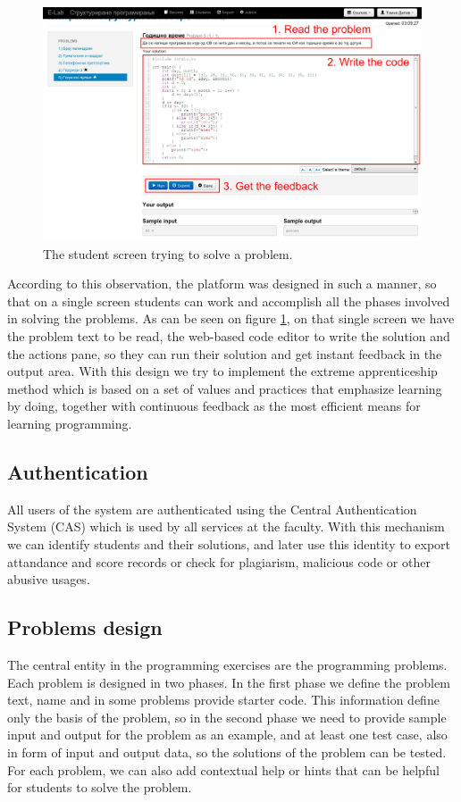 \documentclass{article}
\begin{document}
\begin{figure}
\centering
\includegraphics[width=.99\textwidth]{e-lab/user_screen}
\caption{The student screen trying to solve a problem.}
\label{fig:student_screen}
\end{figure}

According to this observation, the platform was designed in such a manner, so
that on a single screen students can work and accomplish all the phases involved
in solving the problems. As can be seen on figure \ref{fig:student_screen}, on
that single screen we have the problem text to be read, the web-based code
editor to write the solution and the actions pane, so they can run their
solution and get instant feedback in the output area. With this design we try to
implement the extreme apprenticeship method \cite{vihavainen2011extreme} which
is based on a set of values and practices that emphasize learning by doing,
together with continuous feedback as the most efficient means for learning
programming.

\subsection{Authentication}
All users of the system are authenticated using the Central Authentication
System (CAS) which is used by all services at the faculty. With this mechanism
we can identify students and their solutions, and later use this identity to
export attandance and score records or check for plagiarism, malicious code or
other abusive usages.

\subsection{Problems design}
The central entity in the programming exercises are the programming problems.
Each problem is designed in two phases. In the first phase we define the problem
text, name and in some problems provide starter code. This information define
only the basis of the problem, so in the second phase we need to provide sample
input and output for the problem as an example, and at least one test case, also
in form of input and output data, so the solutions of the problem can be tested.
For each problem, we can also add contextual help or hints that can be helpful
for students to solve the problem.
\end{document}
